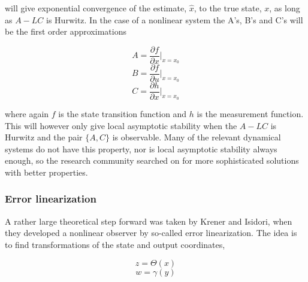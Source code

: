will give exponential convergence of the estimate, $\hat{x}$, to the true state, $x$, as long as $A-LC$ is Hurwitz\cite{Hurwitz}. In the case of a nonlinear system the A's, B's and C's will be the first order approximations

\begin{equation}
    A = \frac{\partial f}{\partial x}|_{x=x_0}
\end{equation}
\begin{equation}
    B = \frac{\partial f}{\partial u}|_{x=x_0}
\end{equation}
\begin{equation}
    C = \frac{\partial h}{\partial x}|_{x=x_0}
\end{equation}

where again $f$ is the state transition function and $h$ is the measurement function. This will however only give local asymptotic stability when the $A-LC$ is Hurwitz and the pair $\{A,C\}$ is observable. Many of the relevant dynamical systems do not have this property, nor is local asymptotic stability always enough, so the research community searched on for more sophisticated solutions with better properties. 

\subsubsection{Error linearization}

A rather large theoretical step forward was taken by Krener and Isidori\cite{FirstErrorLinNonlinObs}, when they developed a nonlinear observer by so-called error linearization. The idea is to find transformations of the state and output coordinates, 

\begin{equation}
    z = \Theta(x)
\end{equation}
\begin{equation}
    w = \gamma(y)
\end{equation}

